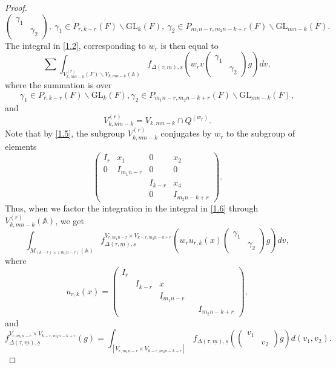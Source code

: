 \documentclass[12pts]{amsart}
\newcommand{\BA}{{\mathbb {A}}}
\newcommand{\GL}{{\mathrm{GL}}}
\begin{document}
\begin{proof}
$$
\begin{pmatrix}\gamma_1\\&\gamma_2\end{pmatrix},\ \gamma_1\in P_{r,k-r}(F)\backslash \GL_k(F),\ \gamma_2\in P_{m_1n-r,m_2n-k+r}(F)\backslash \GL_{mn-k}(F).
$$  	
The integral in \eqref{1.2}, corresponding to $w_r$ is then equal to
\begin{equation}\label{1.6}
	\sum	
    	\int_{V_{k,mn-k}^{(r)}(F)\backslash V_{k,mn-k}(\BA)}f_{\Delta(\tau,\underline{m}),\underline{s}}(w_rv\begin{pmatrix}\gamma_1\\&\gamma_2\end{pmatrix}g)dv,
    \end{equation}
where the summation is over 
$$
\gamma_1\in P_{r,k-r}(F)\backslash \GL_k(F), \gamma_2\in P_{m_1n-r,m_2n-k+r}(F)\backslash \GL_{mn-k}(F),
$$
and
$$
V_{k,mn-k}^{(r)}=V_{k,mn-k}\cap Q^{(w_r)}.
$$
Note that by \eqref{1.5}, the subgroup $V_{k,mn-k}^{(r)}$ conjugates by $w_r$ to the subgroup of elements   	
\begin{equation}\label{1.7}
	\begin{pmatrix}I_r&x_1&0&x_2\\0&I_{m_1n-r}&0&0\\&&I_{k-r}&x_4\\&&0&I_{m_2n-k+r}\end{pmatrix}.
\end{equation}    	
Thus, when we factor the integration in the integral in \eqref{1.6} through $V_{k,mn-k}^{(r)}(\BA)$, we get 
\begin{equation}\label{1.8}
	\int_{M_{(k-r)\times (m_1n-r)}(\BA)}f^{V_{r,m_1n-r}\times V_{k-r,m_2n-k+r}}_{\Delta(\tau,\underline{m}),\underline{s}}(w_ru_{r,k}(x)\begin{pmatrix}\gamma_1\\&\gamma_2\end{pmatrix}g)dv,
\end{equation}    	
 where 
 $$
 u_{r,k}(x)=\begin{pmatrix}I_r\\&I_{k-r}&x\\&&I_{m_1n-r}\\&&&&I_{m_2n-k+r}\end{pmatrix},
 $$
 and
 $$
 f^{V_{r,m_1n-r}\times V_{k-r,m_2n-k+r}}_{\Delta(\tau,\underline{m}),\underline{s}}(g)=\int_{ [V_{r,m_1n-r}\times V_{k-r,m_2n-k+r}]}f_{\Delta(\tau,\underline{m}),\underline{s}}(\begin{pmatrix}v_1\\&v_2\end{pmatrix}g)d(v_1,v_2).
$$
\end{proof}
\end{document}
